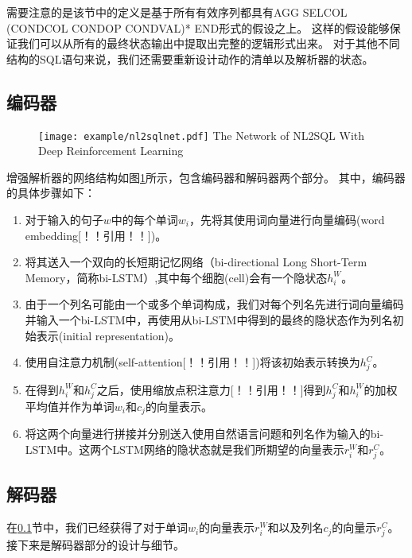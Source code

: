 需要注意的是该节中的定义是基于所有有效序列都具有AGG  SELCOL  (CONDCOL  CONDOP  CONDVAL)* END形式的假设之上。
这样的假设能够保证我们可以从所有的最终状态输出中提取出完整的逻辑形式出来。
对于其他不同结构的SQL语句来说，我们还需要重新设计动作的清单以及解析器的状态。


\subsection{编码器}
\label{enl2sql:encoder}

\begin{figure}[!htp]
  \centering
  \texttt{[image: example/nl2sqlnet.pdf]}
    {The Network of NL2SQL With Deep Reinforcement Learning}
  \label{fig:nl2sqlnet}
\end{figure}


增强解析器的网络结构如图\ref{fig:nl2sqlnet}所示，包含编码器和解码器两个部分。
其中，编码器的具体步骤如下：
\begin{enumerate}
  \item 对于输入的句子$w$中的每个单词$w_i$，先将其使用词向量进行向量编码(word embedding[！！引用！！])。
  \item 将其送入一个双向的长短期记忆网络（bi-directional Long Short-Term Memory，简称bi-LSTM）,其中每个细胞(cell)会有一个隐状态$h^W_i$。
  \item 由于一个列名可能由一个或多个单词构成，我们对每个列名先进行词向量编码并输入一个bi-LSTM中，再使用从bi-LSTM中得到的最终的隐状态作为列名初始表示(initial representation)。
  \item 使用自注意力机制(self-attention[！！引用！！])将该初始表示转换为$h^C_j$。
  \item 在得到$h^W_i$和$h^C_j$之后，使用缩放点积注意力[！！引用！！]得到$h^C_j$和$h^W_i$的加权平均值并作为单词$w_i$和$c_j$的向量表示。
  \item 将这两个向量进行拼接并分别送入使用自然语言问题和列名作为输入的bi-LSTM中。这两个LSTM网络的隐状态就是我们所期望的向量表示$r^W_i$和$r^C_j$。
\end{enumerate}


\subsection{解码器}
\label{enl2sql:decoder}

在\ref{enl2sql:encoder}节中，我们已经获得了对于单词$w_i$的向量表示$r^W_i$和以及列名$c_j$的向量示$r^C_j$。
接下来是解码器部分的设计与细节。

